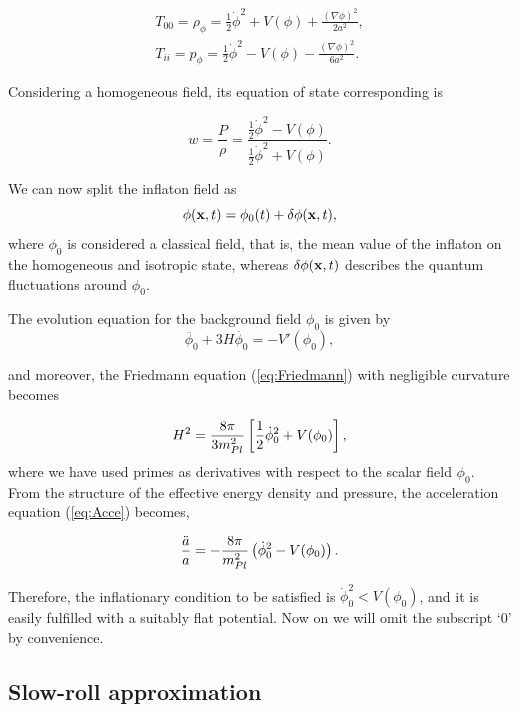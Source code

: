 \documentclass{rmaa}
\def\beq{\begin{equation}}
\def\eeq{\end{equation}}
\begin{document}
\begin{eqnarray}
T_{00}=\rho_{\phi}=\frac{1}{2}\dot{\phi}^2 + V(\phi)+ 
\frac{(\nabla \phi)^2}{2a^2},  \\
T_{ii}=p_{\phi}=\frac{1}{2}\dot{\phi}^2 - V(\phi)- \frac{(\nabla
\phi)^2}{6a^2}.
\end{eqnarray}

\noindent
Considering a homogeneous field, its equation of state corresponding is
 
\begin{equation}
w = \frac{P}{\rho}=\frac{\frac{1}{2}\dot \phi^2-V(\phi)}{\frac{1}{2}\dot \phi^2+V(\phi)}.
\end{equation}

\noindent
We can now split the inflaton field as
\beq \label{eq:split}
\phi({\bf x},t)=\phi_{0}(t)+\delta\phi({\bf x},t),
\eeq
where $\phi_{0}$ is considered a classical field, that is, 
the mean value of the inflaton on the homogeneous and isotropic state, 
whereas $\delta\phi({\bf x},t)$ describes the quantum fluctuations around $\phi_{0}$.

\noindent
The evolution equation for the background field $\phi_0$  is given by
\begin{equation}
\ddot{\phi_0}+ 3H\dot{\phi_0}= -V'(\phi_0),
\label{eq:motion1}
\end{equation}

\noindent
and moreover, the Friedmann equation (\ref{eq:Friedmann}) with negligible curvature becomes

\beq \label{eq:motion2}
H^2 = \frac{8\pi}{3m^2_{Pl}} \left[{1 \over 2} \dot\phi_0^2 +V(\phi_0)\right],
\eeq
where we have used 
primes as derivatives with respect to the scalar field $\phi_0$. 
\\

 From the structure of the effective energy density and pressure, the acceleration
  equation (\ref{eq:Acce}) becomes, 
 
 \beq
 {\ddot a \over a} = -{8\pi \over m_{Pl}^2}\left(\dot \phi_0^2-V(\phi_0) \right).
 \eeq
 
 \noindent
 Therefore, the inflationary condition to be satisfied is $\dot \phi_0^2 < V(\phi_0)$, and 
 it is easily fulfilled with a suitably flat potential. Now on we will omit the subscript
 `0' by convenience.



\subsection{Slow-roll approximation}
\vskip 6pt
\end{document}
